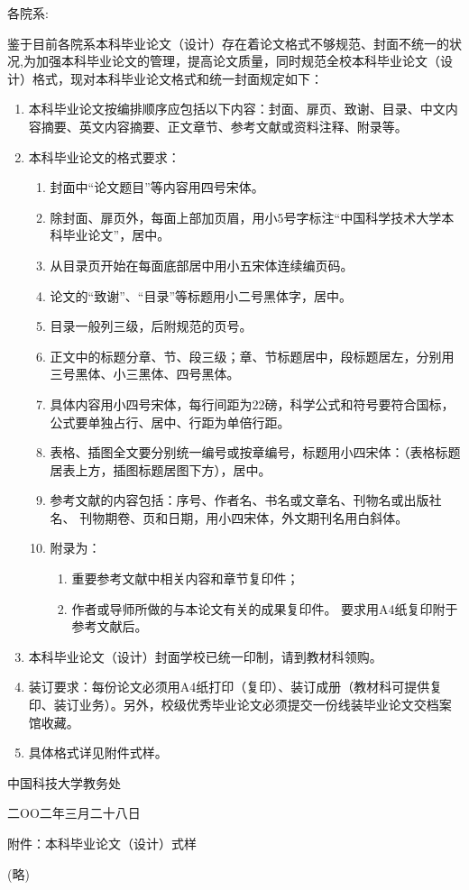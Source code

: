 \hspace{-2em}各院系:

鉴于目前各院系本科毕业论文（设计）存在着论文格式不够规范、封面不统一的状况,为加强本科毕业论文的管理，提高论文质量，同时规范全校本科毕业论文（设计）格式，现对本科毕业论文格式和统一封面规定如下：
\begin{enumerate}
\item 本科毕业论文按编排顺序应包括以下内容：封面、扉页、致谢、目录、中文内容摘要、英文内容摘要、正文章节、参考文献或资料注释、附录等。
\item 本科毕业论文的格式要求：
\begin{enumerate}
\item 封面中“论文题目”等内容用四号宋体。
\item 除封面、扉页外，每面上部加页眉，用小5号字标注“中国科学技术大学本科毕业论文”，居中。
\item 从目录页开始在每面底部居中用小五宋体连续编页码。
\item 论文的“致谢”、“目录”等标题用小二号黑体字，居中。
\item 目录一般列三级，后附规范的页号。
\item 正文中的标题分章、节、段三级；章、节标题居中，段标题居左，分别用三号黑体、小三黑体、四号黑体。
\item 具体内容用小四号宋体，每行间距为22磅，科学公式和符号要符合国标，公式要单独占行、居中、行距为单倍行距。
\item 表格、插图全文要分别统一编号或按章编号，标题用小四宋体：（表格标题居表上方，插图标题居图下方），居中。
\item 参考文献的内容包括：序号、作者名、书名或文章名、刊物名或出版社名、
刊物期卷、页和日期，用小四宋体，外文期刊名用白斜体。
\item 附录为：
\begin{enumerate}
\item 重要参考文献中相关内容和章节复印件；
\item 作者或导师所做的与本论文有关的成果复印件。
要求用A4纸复印附于参考文献后。
\end{enumerate}
\end{enumerate}
\item 本科毕业论文（设计）封面学校已统一印制，请到教材科领购。
\item 装订要求：每份论文必须用A4纸打印（复印）、装订成册（教材科可提供复印、装订业务）。另外，校级优秀毕业论文必须提交一份线装毕业论文交档案馆收藏。
\item 具体格式详见附件式样。
\end{enumerate}
\begin{flushright}
中国科技大学教务处

二OO二年三月二十八日
\end{flushright}
附件：本科毕业论文（设计）式样

(略)
